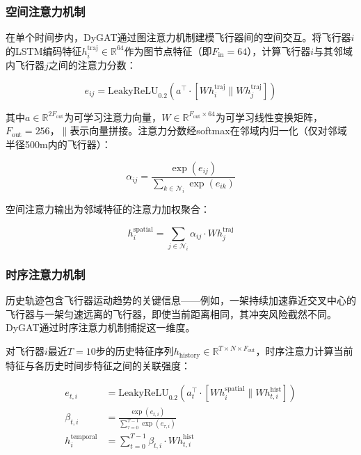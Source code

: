 \documentclass[12pt,a4paper,UTF8]{ctexart}
\begin{document}
\subsubsection{空间注意力机制}

在单个时间步内，DyGAT通过图注意力机制建模飞行器间的空间交互。将飞行器$i$的LSTM编码特征$h_i^{\text{traj}} \in \mathbb{R}^{64}$作为图节点特征（即$F_{\text{in}}=64$），计算飞行器$i$与其邻域内飞行器$j$之间的注意力分数：

\begin{equation}
    e_{ij} = \text{LeakyReLU}_{0.2}\left(a^{\top} \cdot [W h_i^{\text{traj}} \parallel W h_j^{\text{traj}}]\right)
\end{equation}

其中$a \in \mathbb{R}^{2F_{\text{out}}}$为可学习注意力向量，$W \in \mathbb{R}^{F_{\text{out}} \times 64}$为可学习线性变换矩阵，$F_{\text{out}}=256$，$\parallel$表示向量拼接。注意力分数经softmax在邻域内归一化（仅对邻域半径500m内的飞行器）：

\begin{equation}
    \alpha_{ij} = \frac{\exp(e_{ij})}{\sum_{k \in \mathcal{N}_i} \exp(e_{ik})}
\end{equation}

空间注意力输出为邻域特征的注意力加权聚合：

\begin{equation}
    h_i^{\text{spatial}} = \sum_{j \in \mathcal{N}_i} \alpha_{ij} \cdot W h_j^{\text{traj}}
\end{equation}

\subsubsection{时序注意力机制}

历史轨迹包含飞行器运动趋势的关键信息——例如，一架持续加速靠近交叉中心的飞行器与一架匀速远离的飞行器，即使当前距离相同，其冲突风险截然不同。DyGAT通过时序注意力机制捕捉这一维度。

对飞行器$i$最近$T=10$步的历史特征序列$h_{\text{history}} \in \mathbb{R}^{T \times N \times F_{\text{out}}}$，时序注意力计算当前特征与各历史时间步特征之间的关联强度：

\begin{align}
    e_{t,i} &= \text{LeakyReLU}_{0.2}\left(a_t^{\top} \cdot [W h_i^{\text{spatial}} \parallel W h_{t,i}^{\text{hist}}]\right) \\
    \beta_{t,i} &= \frac{\exp(e_{t,i})}{\sum_{\tau=0}^{T-1} \exp(e_{\tau,i})} \\
    h_i^{\text{temporal}} &= \sum_{t=0}^{T-1} \beta_{t,i} \cdot W h_{t,i}^{\text{hist}}
\end{align}
\end{document}
